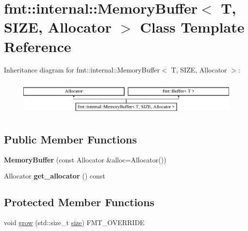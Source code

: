 \hypertarget{classfmt_1_1internal_1_1MemoryBuffer}{}\section{fmt\+:\+:internal\+:\+:Memory\+Buffer$<$ T, S\+I\+ZE, Allocator $>$ Class Template Reference}
\label{classfmt_1_1internal_1_1MemoryBuffer}
Inheritance diagram for fmt\+:\+:internal\+:\+:Memory\+Buffer$<$ T, S\+I\+ZE, Allocator $>$\+:\begin{figure}[H]
\begin{center}
\leavevmode
\includegraphics[height=1.872910cm]{classfmt_1_1internal_1_1MemoryBuffer}
\end{center}
\end{figure}
\subsection*{Public Member Functions}
\begin{DoxyCompactItemize}
\item 
{\bfseries Memory\+Buffer} (const Allocator \&alloc=Allocator())\hypertarget{classfmt_1_1internal_1_1MemoryBuffer_af3325b8e955a9c84a51c31570bcab893}{}\label{classfmt_1_1internal_1_1MemoryBuffer_af3325b8e955a9c84a51c31570bcab893}

\item 
Allocator {\bfseries get\+\_\+allocator} () const \hypertarget{classfmt_1_1internal_1_1MemoryBuffer_a6cf259337ce910f8864512d664daf66f}{}\label{classfmt_1_1internal_1_1MemoryBuffer_a6cf259337ce910f8864512d664daf66f}

\end{DoxyCompactItemize}
\subsection*{Protected Member Functions}
\begin{DoxyCompactItemize}
\item 
void \hyperlink{classfmt_1_1internal_1_1MemoryBuffer_a6ecee679d5caf3345f8ffae92b7ca702}{grow} (std\+::size\+\_\+t \hyperlink{classfmt_1_1Buffer_a14fa72f0ddf584c14ffffb1446f598aa}{size}) F\+M\+T\+\_\+\+O\+V\+E\+R\+R\+I\+DE
\end{DoxyCompactItemize}
